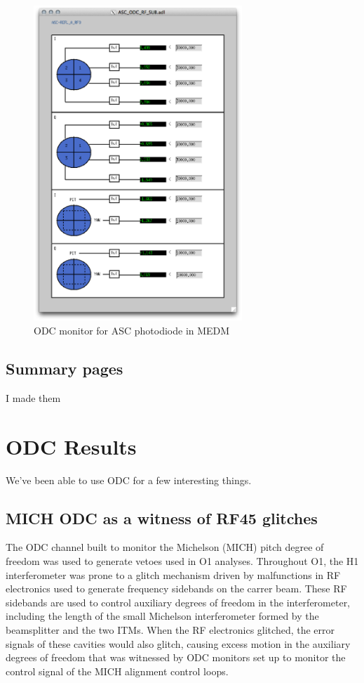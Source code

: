 \begin{figure}[ht!]
\includegraphics[width=0.7\textwidth]{figures/ODC/PD_screen}
\caption[ASC ODC Photodiode Monitor in MEDM]{ODC monitor for ASC photodiode in MEDM}
\label{fig:odc-pd-screen}
\end{figure}

\subsection{Summary pages}
I made them

\section{ODC Results}

We've been able to use ODC for a few interesting things.

\subsection{MICH ODC as a witness of RF45 glitches}

The ODC channel built to monitor the Michelson (MICH) pitch degree of freedom 
was used to generate vetoes used in O1 analyses. Throughout O1, the H1 
interferometer was prone to a glitch mechanism driven by malfunctions in 
RF electronics used to generate frequency sidebands on the carrer beam. 
These RF sidebands are used to control auxiliary degrees of freedom in the 
interferometer, including the length of the small Michelson interferometer 
formed by the beamsplitter and the two ITMs. When the RF electronics glitched, 
the error signals of these cavities would also glitch, causing excess motion 
in the auxiliary degrees of freedom that was witnessed by ODC monitors set 
up to monitor the control signal of the MICH alignment control loops. 


